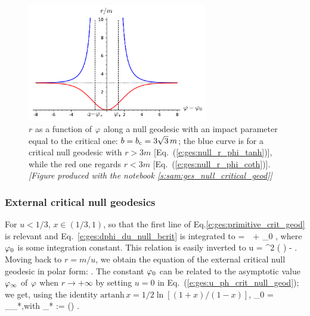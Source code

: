 \begin{figure}
\centerline{\includegraphics[width=0.7\textwidth]{ges_null_r_phi_bcrit.pdf}}
\caption[]{\label{f:gis:null_r_phi_bcrit} \footnotesize
$r$ as a function of $\varphi$ along a null geodesic with an impact parameter
equal to the critical one:
$b = b_{\rm c} = 3\sqrt{3} \, m$; the blue curve is for a critical
null geodesic with $r>3m$
[Eq.~(\ref{e:ges:null_r_phi_tanh})], while the red one
regards $r<3m$ [Eq.~(\ref{e:ges:null_r_phi_coth})].
\textsl{[Figure produced with the notebook \ref{s:sam:ges_null_critical_geod}]}
}
\end{figure}

\subsubsection{External critical null geodesics} \label{s:gis:extern_crit_geod}

For $u<1/3$, $x\in(1/3, 1)$, so that the first line of Eq.\eqref{e:ges:primitive_crit_geod}
is relevant and Eq.~\eqref{e:ges:dphi_du_null_bcrit} is integrated to
\be \label{e:ges:ph_u_crit_null_geod}
    \ph =  \,\,  + \ph_0 ,
\ee
where $\varphi_0$ is some integration constant. This relation is easily inverted
to
\be \label{e:ges:u_ph_crit_null_geod}
    u =   \tanh^2 \left( \right) -  .
\ee
Moving back to $r = m/u$, we obtain the equation of the external critical
null geodesic in polar form:
\be \label{e:ges:null_r_phi_tanh}
   .
\ee
The constant $\varphi_0$ can be related to the asymptotic value $\varphi_\infty$ of $\varphi$
when $r\to +\infty$ by setting $u=0$ in Eq.~(\ref{e:ges:u_ph_crit_null_geod});
we get, using the identity $\mathrm{artanh}\,  x = 1/2\ln[(1+x)/(1-x)]$,
\be \label{e:ges:null_ph_0_ph_inf}
    \ph_0 = \ph_\infty \pm \ph_*,\quad\mbox{with}\quad
    \ph_* := \ln\left(\right)
    .
\ee

